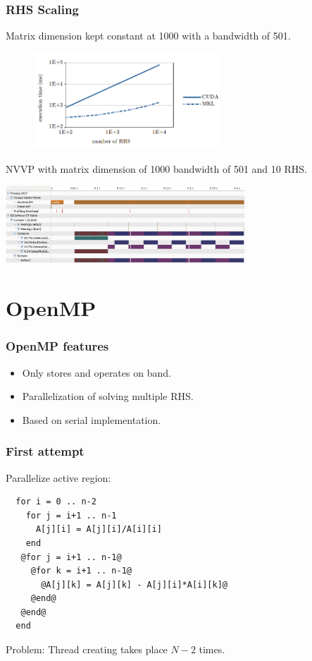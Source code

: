 \documentclass{beamer}
\begin{document}
\begin{frame}
\frametitle{RHS Scaling}
{\small
Matrix dimension kept constant at 1000 with a bandwidth of 501.}
\vspace*{-0.1cm}
\begin{figure}[H]
\label{rhs}
\centerline{\includegraphics[width=7cm]{rhs.png}}
\end{figure}
\vspace{-1.1cm}

{\small NVVP with matrix dimension of 1000 bandwidth of 501 and 10 RHS.}
\vspace{0.1cm}
\centerline{\includegraphics[width=9cm]{nvvp.png}}

\end{frame}

\section{OpenMP}
\begin{frame}
\frametitle{OpenMP features}
\begin{itemize}
\item{Only stores and operates on band.}
\item{Parallelization of solving multiple RHS.}
\item{Based on serial implementation.}
\end{itemize}
\end{frame}
\begin{frame}[fragile]
\frametitle{First attempt}

Parallelize active region:
\begin{lstlisting}
  for i = 0 .. n-2
    for j = i+1 .. n-1
      A[j][i] = A[j][i]/A[i][i]
    end
   @for j = i+1 .. n-1@
     @for k = i+1 .. n-1@
       @A[j][k] = A[j][k] - A[j][i]*A[i][k]@
     @end@
   @end@
  end
\end{lstlisting}

Problem: Thread creating takes place $N-2$ times.
\end{frame}
\end{document}
